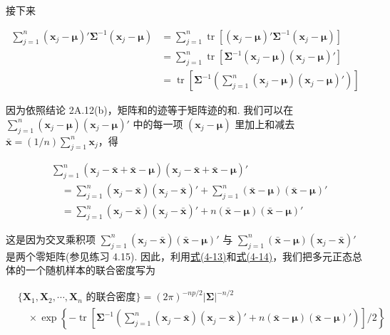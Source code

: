 接下来

\label{eq:4-13}
\begin{equation}
\begin{aligned}
\sum_{j=1}^{n}(\mathbf{x}_j-\boldsymbol{\mu})'\boldsymbol{\Sigma}^{-1}(\mathbf{x}_j-\boldsymbol{\mu})
&=\sum_{j=1}^{n}\operatorname{tr}\left[(\mathbf{x}_j-\boldsymbol{\mu})'\boldsymbol{\Sigma}^{-1}(\mathbf{x}_j-\boldsymbol{\mu})\right]\\
&=\sum_{j=1}^{n}\operatorname{tr}\left[\boldsymbol{\Sigma}^{-1}(\mathbf{x}_j-\boldsymbol{\mu})(\mathbf{x}_j-\boldsymbol{\mu})'\right]\\
&=\operatorname{tr}\left[\boldsymbol{\Sigma}^{-1}\left(\sum_{j=1}^{n}(\mathbf{x}_j-\boldsymbol{\mu})(\mathbf{x}_j-\boldsymbol{\mu})'\right)\right]
\end{aligned}
\tag{4-13}
\end{equation}

因为依照结论 2A.12(b)，矩阵和的迹等于矩阵迹的和. 我们可以在 $\sum\limits_{j=1}^{n}(\mathbf{x}_j-\boldsymbol{\mu})(\mathbf{x}_j-\boldsymbol{\mu})'$ 中的每一项 $(\mathbf{x}_j-\boldsymbol{\mu})$ 里加上和减去 $\bar{\mathbf{x}}=(1/n)\sum\limits_{j=1}^{n}\mathbf{x}_j$，得

\label{eq:4-14}
\begin{equation}
\begin{aligned}
&\sum_{j=1}^{n}(\mathbf{x}_j-\bar{\mathbf{x}}+\bar{\mathbf{x}}-\boldsymbol{\mu})(\mathbf{x}_j-\bar{\mathbf{x}}+\bar{\mathbf{x}}-\boldsymbol{\mu})'\\
&\quad=\sum_{j=1}^{n}(\mathbf{x}_j-\bar{\mathbf{x}})(\mathbf{x}_j-\bar{\mathbf{x}})'+\sum_{j=1}^{n}(\bar{\mathbf{x}}-\boldsymbol{\mu})(\bar{\mathbf{x}}-\boldsymbol{\mu})'\\
&\quad=\sum_{j=1}^{n}(\mathbf{x}_j-\bar{\mathbf{x}})(\mathbf{x}_j-\bar{\mathbf{x}})'+n(\bar{\mathbf{x}}-\boldsymbol{\mu})(\bar{\mathbf{x}}-\boldsymbol{\mu})'
\end{aligned}
\tag{4-14}
\end{equation}

这是因为交叉乘积项 $\sum\limits_{j=1}^{n}(\mathbf{x}_j-\bar{\mathbf{x}})(\bar{\mathbf{x}}-\boldsymbol{\mu})'$ 与 $\sum\limits_{j=1}^{n}(\bar{\mathbf{x}}-\boldsymbol{\mu})(\mathbf{x}_j-\bar{\mathbf{x}})'$ 是两个零矩阵(参见练习 4.15). 因此，利用\hyperref[eq:4-13]{式(4-13)}和\hyperref[eq:4-14]{式(4-14)}，我们把多元正态总体的一个随机样本的联合密度写为

\label{eq:4-15}
\begin{equation}
\begin{aligned}
&\{\mathbf{X}_1,\mathbf{X}_2,\cdots,\mathbf{X}_n\text{ 的联合密度}\}=(2\pi)^{-np/2}|\boldsymbol{\Sigma}|^{-n/2}\\
&\quad\times\exp\left\{-\operatorname{tr}\left[\boldsymbol{\Sigma}^{-1}\left(\sum_{j=1}^{n}(\mathbf{x}_j-\bar{\mathbf{x}})(\mathbf{x}_j-\bar{\mathbf{x}})'+n(\bar{\mathbf{x}}-\boldsymbol{\mu})(\bar{\mathbf{x}}-\boldsymbol{\mu})'\right)\right]\Big/2\right\}
\end{aligned}
\tag{4-15}
\end{equation}
